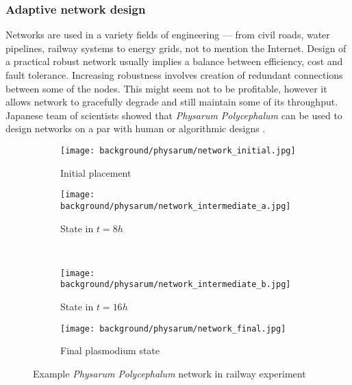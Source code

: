 \subsubsection{Adaptive network design}

Networks are used in a variety fields of engineering --- from civil roads, water pipelines, railway systems to energy grids, not to mention the Internet. Design of a practical robust network usually implies a balance between efficiency, cost and fault tolerance. Increasing robustness involves creation of redundant connections between some of the nodes. This might seem not to be profitable, however it allows network to gracefully degrade and still maintain some of its throughput. Japanese team of scientists showed that \textit{Physarum Polycephalum} can be used to design networks on a par with human or algorithmic designs \cite{tero2010rules}.

\begin{figure}
  \centering
  \begin{subfigure}{0.33\textwidth}
    \centering
    \texttt{[image: background/physarum/network\_initial.jpg]}
    \caption{Initial placement}
    \label{figure:bp_network_initial}
  \end{subfigure}
  \begin{subfigure}{0.33\textwidth}
    \centering
    \texttt{[image: background/physarum/network\_intermediate\_a.jpg]}
    \caption{State in $t=8h$}
    \label{figure:bp_network_intermediate_a}
  \end{subfigure}
  \\
  \begin{subfigure}{0.33\textwidth}
    \centering
    \texttt{[image: background/physarum/network\_intermediate\_b.jpg]}
    \caption{State in $t=16h$}
    \label{figure:bp_network_intermediate_b}
  \end{subfigure}
  \begin{subfigure}{0.33\textwidth}
    \centering
    \texttt{[image: background/physarum/network\_final.jpg]}
    \caption{Final plasmodium state}
    \label{figure:bp_network_final}
  \end{subfigure}
  \caption{Example \textit{Physarum Polycephalum} network in railway experiment \cite{tero2010rules}}
\end{figure}

